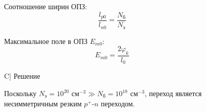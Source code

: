 \documentclass[12pt,a4paper]{article}
\theoremstyle{plain}
\theoremstyle{definition}
\theoremstyle{remark}
\numberwithin{equation}{section}
\begin{document}
\begin{figure}[H]
\begin{minipage}[t]{0.32\textwidth}
    Соотношение ширин ОПЗ:
    \begin{equation*}
        \frac{l_{p0}}{l_{n0}} = \frac{N_\text{б}}{N_\text{э}}
    \end{equation*}

    Максимальное поле в ОПЗ $E_{m0}$:
    \begin{equation*}
        E_{m0} = \frac{2\varphi_k}{l_0}
    \end{equation*}

    \end{minipage}\hfill\begin{minipage}[t]{0.66\textwidth}
        \vspace{0em}
        \begin{tabularx}{\textwidth}{C|}
            \hline
            Решение \\
            \hline
        \end{tabularx}

        \vspace{0.5em}
        \hspace{0.025\textwidth}
        \begin{minipage}[t]{0.95\textwidth}
            Поскольку $N_\text{э} = 10^{20}\text{ см}^{-3} \gg N_\text{б} = 10^{18}\text{ см}^{-3}$, переход является несимметричным резким $p^+$-$n$ переходом.


\end{minipage}
\end{minipage}
\end{figure}
\end{document}
